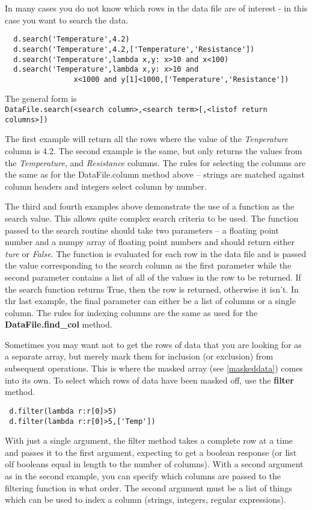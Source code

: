 \documentclass[a4paper,11pt]{scrartcl}
\begin{document}
In many cases you do not know which rows in the data file are of interest - in
this case you want to search the data.
\begin{lstlisting}
  d.search('Temperature',4.2)
  d.search('Temperature',4.2,['Temperature','Resistance'])
  d.search('Temperature',lambda x,y: x>10 and x<100)
  d.search('Temperature',lambda x,y: x>10 and
                x<1000 and y[1]<1000,['Temperature','Resistance'])
\end{lstlisting}
The general form is \\\verb:DataFile.search(<search column>,<search term>[,<listof return columns>]):

The first example will return all the rows where the value of the
\textit{Tenperature} column is 4.2. The second example is the same, but only
returns the values from the \textit{Temperature}, and \textit{Resistance}
columns. The rules for selecting the columns are the same as for the
DataFile.column method above -- strings are matched against column headers and
integers select column by number.

The third and fourth examples above demonstrate the use of a function as the
search value. This allows quite complex search criteria to be used. The function
passed to the search routine should take two parameters -- a floating point
number and a numpy array of floating point numbers and should return either
\textit{ture} or \textit{False}. The function is evaluated for each row in the
data file and is passed the value corresponding to the search column as the
first parameter while the second parameter contains a list of all of the values
in the row to be returned. If the search function returns True, then the row is
returned, otherwise it isn't. In thr last example, the final parameter can
either be a list of columns or a single column. The rules for indexing columns
are the same as used for the \textbf{DataFile.find\_col} method.

Sometimes you may want not to get the rows of data that you are looking for as a
separate array, but merely mark them for inclusion (or exclusion) from subsequent
operations. This is where the masked array (see \ref{maskeddata}) comes into its own.
To select which rows of data have been masked off, use the \textbf{filter} method.

\begin{lstlisting}
 d.filter(lambda r:r[0]>5)
 d.filter(lambda r:r[0]>5,['Temp'])
\end{lstlisting}

With just a single argument, the filter method takes a complete row at a time and passes it
to the first argument, expecting to get a boolean response (or list olf booleans equal in length
to the number of columns). With a second argument as in the second example, you can specify which
columns are passed to the filtering function in what order. The second argument must be a list
of things which can be used to index a column (\ie strings, integers, regular expressions).
\end{document}
